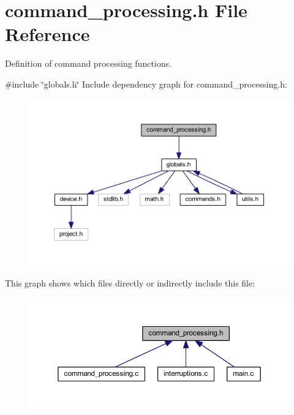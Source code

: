 \section{command\+\_\+processing.\+h File Reference}
\label{command__processing_8h}


Definition of command processing functions.  


{\ttfamily \#include \char`\"{}globals.\+h\char`\"{}}\newline
Include dependency graph for command\+\_\+processing.\+h\+:
\nopagebreak
\begin{figure}[H]
\begin{center}
\leavevmode
\includegraphics[width=350pt]{command__processing_8h__incl}
\end{center}
\end{figure}
This graph shows which files directly or indirectly include this file\+:
\nopagebreak
\begin{figure}[H]
\begin{center}
\leavevmode
\includegraphics[width=350pt]{command__processing_8h__dep__incl}
\end{center}
\end{figure}

